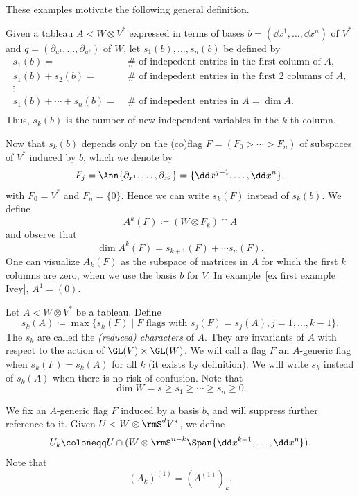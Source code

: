 These examples motivate the following general definition.

\begin{defn}
    Given a tableau $A<W\otimes V^\ast$ expressed in terms of bases $b=(\dd x^1,\ldots,\dd x^n)$ of $V^\ast$ and $q=(\partial_{u^1},\ldots,\partial_{u^s})$ of $W$, let $s_1(b),\ldots,s_n(b)$ be defined by 
    \begin{align}
        s_1(b)=&\; \#\text{ of indepedent entries in the first column of }A,\\
        s_1(b)+s_2(b)=&\; \#\text{ of indepedent entries in the first 2 columns of }A,\\
        \vdots &\\
        s_1(b)+\cdots +s_n(b)=&\; \#\text{ of indepedent entries in }A=\dim A.\\
    \end{align}
    Thus, $s_k(b)$ is the number of new independent variables in the $k$-th column.
\end{defn}

Now that $s_k(b)$ depends only on the (co)flag $F=(F_0>\cdots >F_n)$ of subspaces of $V^\ast$ induced by $b$, which we denote by 
\[F_j=\Ann\{\partial_{x^1},\ldots,\partial_{x^j}\}=\{\dd x^{j+1},\ldots, \dd x^n\},\]
with $F_0=V^\ast$ and $F_n=\{0\}$. Hence we can write $s_k(F)$ instead of $s_k(b)$. We define 
\[A^k(F)\coloneqq (W\otimes F_k)\cap A\]
and observe that 
\[\dim A^k(F)=s_{k+1}(F)+\cdots s_n(F).\label{eq 5.17 Ivey}\]
One can visualize $A_k(F)$ as the subspace of matrices in $A$ for which the first $k$ columns are zero, when we use the basis $b$ for $V$. In example~\ref{ex first example Ivey}, $A^1=(0)$.

\begin{defn}
    Let $A<W\otimes V^\ast$ be a tableau. Define 
    \[s_k(A)\coloneqq \max\{s_k(F)\mid F\text{ flags with }s_j(F)=s_j(A),j=1,\ldots,k-1\}.\]
    The $s_k$ are called the \emph{(reduced) characters} of $A$. They are invariants of $A$ with respect to the action of $\GL(V)\times\GL(W)$. We will call a flag $F$ an $A$-generic flag when $s_k(F)=s_k(A)$ for all $k$ (it exists by definition). We will write $s_k$ instead of $s_k(A)$ when there is no risk of confusion. Note that 
    \[\dim W=s\geq s_1\geq \cdots \geq s_n\geq 0.\]
\end{defn}

We fix an $A$-generic flag $F$ induced by a basis $b$, and will suppress further reference to it. Given $U< W\otimes \rmS^d V^\ast$, we define 
\[U_k\coloneqq U\cap (W\otimes \rmS^{n-k}\Span\{\dd x^{k+1},\ldots,\dd x^n\}).\]
Note that 
\[(A_k)^{(1)}=(A^{(1)})_k.\]

